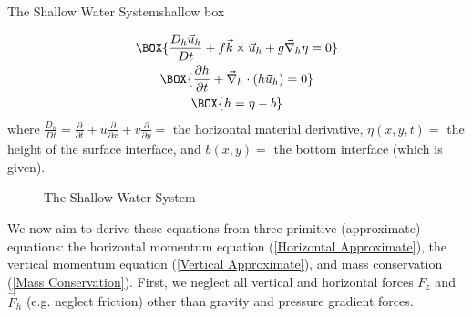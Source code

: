 \begin{fact}{The Shallow Water System}{shallow box}
    \begin{minipage}{.5\linewidth}
    \begin{gather}
        \label{SW mom}
        \BOX{\frac{D_h\vec{u}_h}{Dt}+f\vec{k}\times\vec{u}_h+g\vec{\nabla}_h\eta=0}\\
        \label{SW mass}
        \BOX{\frac{\partial h}{\partial t}+\vec{\nabla}_h\cdot(h\vec{u}_h)=0}\\
        \label{SW height}
        \BOX{h=\eta-b}
    \end{gather}
    where $\frac{D_h}{Dt}=\frac{\partial}{\partial t}+u\frac{\partial}{\partial x}+v\frac{\partial}{\partial y}=$ the horizontal material derivative, $\eta(x,y,t)=$ the height of the surface interface, and $b(x,y)=$ the bottom interface (which is given).
    \end{minipage}
    \hfill
    \begin{minipage}{.48\linewidth}
    \begin{figure}[H]
        \centering
        \caption{The Shallow Water System}
    \end{figure}
    \end{minipage}
\end{fact}

We now aim to derive these equations from three primitive (approximate) equations: the horizontal momentum equation (\ref{Horizontal Approximate}), the vertical momentum equation (\ref{Vertical Approximate}), and mass conservation (\ref{Mass Conservation}). First, we neglect all vertical and horizontal forces $F_z$ and $\vec{F}_h$ (e.g. neglect friction) other than gravity and pressure gradient forces.

